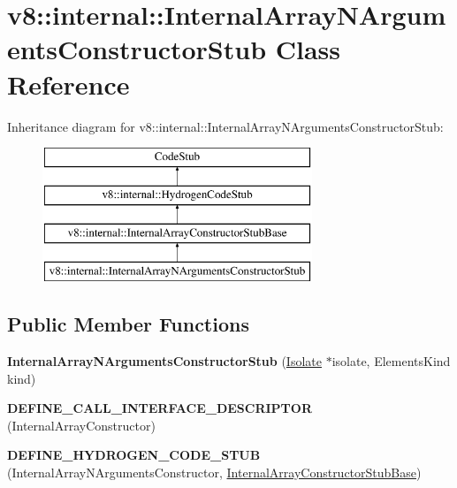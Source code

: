 \hypertarget{classv8_1_1internal_1_1_internal_array_n_arguments_constructor_stub}{}\section{v8\+:\+:internal\+:\+:Internal\+Array\+N\+Arguments\+Constructor\+Stub Class Reference}
\label{classv8_1_1internal_1_1_internal_array_n_arguments_constructor_stub}
Inheritance diagram for v8\+:\+:internal\+:\+:Internal\+Array\+N\+Arguments\+Constructor\+Stub\+:\begin{figure}[H]
\begin{center}
\leavevmode
\includegraphics[height=4.000000cm]{classv8_1_1internal_1_1_internal_array_n_arguments_constructor_stub}
\end{center}
\end{figure}
\subsection*{Public Member Functions}
\begin{DoxyCompactItemize}
\item 
{\bfseries Internal\+Array\+N\+Arguments\+Constructor\+Stub} (\hyperlink{classv8_1_1internal_1_1_isolate}{Isolate} $\ast$isolate, Elements\+Kind kind)\hypertarget{classv8_1_1internal_1_1_internal_array_n_arguments_constructor_stub_af94b73d095ffded5b0cff059e72cbd9a}{}\label{classv8_1_1internal_1_1_internal_array_n_arguments_constructor_stub_af94b73d095ffded5b0cff059e72cbd9a}

\item 
{\bfseries D\+E\+F\+I\+N\+E\+\_\+\+C\+A\+L\+L\+\_\+\+I\+N\+T\+E\+R\+F\+A\+C\+E\+\_\+\+D\+E\+S\+C\+R\+I\+P\+T\+OR} (Internal\+Array\+Constructor)\hypertarget{classv8_1_1internal_1_1_internal_array_n_arguments_constructor_stub_aa23b6ebb87a6141b31398d6397ca8992}{}\label{classv8_1_1internal_1_1_internal_array_n_arguments_constructor_stub_aa23b6ebb87a6141b31398d6397ca8992}

\item 
{\bfseries D\+E\+F\+I\+N\+E\+\_\+\+H\+Y\+D\+R\+O\+G\+E\+N\+\_\+\+C\+O\+D\+E\+\_\+\+S\+T\+UB} (Internal\+Array\+N\+Arguments\+Constructor, \hyperlink{classv8_1_1internal_1_1_internal_array_constructor_stub_base}{Internal\+Array\+Constructor\+Stub\+Base})\hypertarget{classv8_1_1internal_1_1_internal_array_n_arguments_constructor_stub_ab07beb432019f67e9619601d887f3cd9}{}\label{classv8_1_1internal_1_1_internal_array_n_arguments_constructor_stub_ab07beb432019f67e9619601d887f3cd9}

\end{DoxyCompactItemize}
